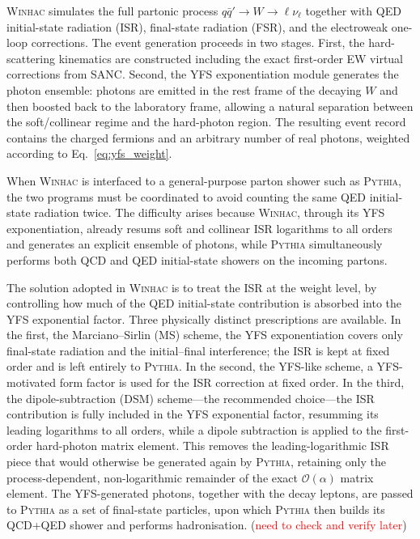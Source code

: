 \textsc{Winhac} simulates the full partonic process $q\bar{q}'\to W\to \ell\nu_\ell$ together with QED initial-state radiation (ISR), final-state radiation (FSR), and the electroweak one-loop corrections. The event generation proceeds in two stages. First, the hard-scattering kinematics are constructed including the exact first-order EW virtual corrections from \textsc{SANC}. Second, the YFS exponentiation module generates the photon ensemble: photons are emitted in the rest frame of the decaying $W$ and then boosted back to the laboratory frame, allowing a natural separation between the soft/collinear regime and the hard-photon region. The resulting event record contains the charged fermions and an arbitrary number of real photons, weighted according to Eq.~\eqref{eq:yfs_weight}.

When \textsc{Winhac} is interfaced to a general-purpose parton shower such as \textsc{Pythia}, the two programs must be coordinated to avoid counting the same QED initial-state radiation twice. The difficulty arises because \textsc{Winhac}, through its YFS exponentiation, already resums soft and collinear ISR logarithms to all orders and generates an explicit ensemble of photons, while \textsc{Pythia} simultaneously performs both QCD and QED initial-state showers on the incoming partons.

The solution adopted in \textsc{Winhac} is to treat the ISR at the weight level, by controlling how much of the QED initial-state contribution is absorbed into the YFS exponential factor. Three physically distinct prescriptions are available. In the first, the Marciano--Sirlin (MS) scheme, the YFS exponentiation covers only final-state radiation and the initial--final interference; the ISR is kept at fixed order and is left entirely to \textsc{Pythia}. In the second, the YFS-like scheme, a YFS-motivated form factor is used for the ISR correction at fixed order. In the third, the dipole-subtraction (DSM) scheme---the recommended choice---the ISR contribution is fully included in the YFS exponential factor, resumming its leading logarithms to all orders, while a dipole subtraction is applied to the first-order hard-photon matrix element. This removes the leading-logarithmic ISR piece that would otherwise be generated again by \textsc{Pythia}, retaining only the process-dependent, non-logarithmic remainder of the exact $\mathcal{O}(\alpha)$ matrix element. The YFS-generated photons, together with the decay leptons, are passed to \textsc{Pythia} as a set of final-state particles, upon which \textsc{Pythia} then builds its QCD+QED shower and performs hadronisation. (\textcolor{red}{need to check and verify later}) 

